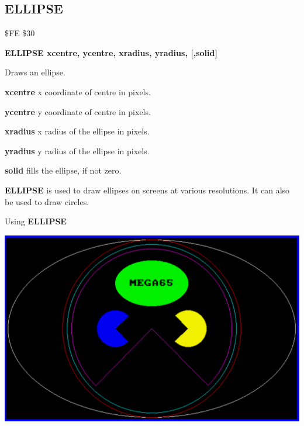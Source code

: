 \subsection{ELLIPSE}
\begin{description}[leftmargin=2cm,style=nextline]
\item [Token:] \$FE \$30
\item [Format:] {\bf ELLIPSE xcentre, ycentre, xradius, yradius, [,solid]}
\item [Usage:] Draws an ellipse.

               {\bf xcentre} x coordinate of centre in pixels.

               {\bf ycentre} y coordinate of centre in pixels.

               {\bf xradius} x radius of the ellipse in pixels.

               {\bf yradius} y radius of the ellipse in pixels.

               {\bf solid} fills the ellipse, if not zero.

\item [Remarks:] {\bf ELLIPSE} is used to draw ellipses on
               screens at various resolutions.
               It can also be used to draw circles.

\item [Example:] Using {\bf ELLIPSE}


\item \begin{center}\includegraphics[width=\linewidth]{images/ellipse.png}\end{center}


\end{description}
